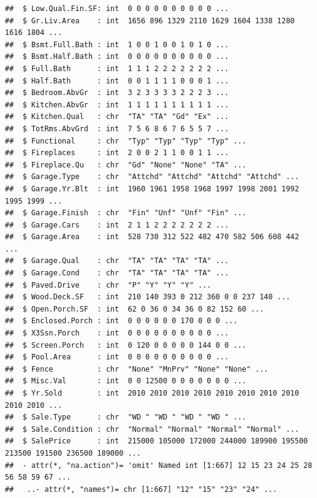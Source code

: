 \documentclass[
]{article}
\begin{document}
\begin{verbatim}
##  $ Low.Qual.Fin.SF: int  0 0 0 0 0 0 0 0 0 0 ...
##  $ Gr.Liv.Area    : int  1656 896 1329 2110 1629 1604 1338 1280 1616 1804 ...
##  $ Bsmt.Full.Bath : int  1 0 0 1 0 0 1 0 1 0 ...
##  $ Bsmt.Half.Bath : int  0 0 0 0 0 0 0 0 0 0 ...
##  $ Full.Bath      : int  1 1 1 2 2 2 2 2 2 2 ...
##  $ Half.Bath      : int  0 0 1 1 1 1 0 0 0 1 ...
##  $ Bedroom.AbvGr  : int  3 2 3 3 3 3 2 2 2 3 ...
##  $ Kitchen.AbvGr  : int  1 1 1 1 1 1 1 1 1 1 ...
##  $ Kitchen.Qual   : chr  "TA" "TA" "Gd" "Ex" ...
##  $ TotRms.AbvGrd  : int  7 5 6 8 6 7 6 5 5 7 ...
##  $ Functional     : chr  "Typ" "Typ" "Typ" "Typ" ...
##  $ Fireplaces     : int  2 0 0 2 1 1 0 0 1 1 ...
##  $ Fireplace.Qu   : chr  "Gd" "None" "None" "TA" ...
##  $ Garage.Type    : chr  "Attchd" "Attchd" "Attchd" "Attchd" ...
##  $ Garage.Yr.Blt  : int  1960 1961 1958 1968 1997 1998 2001 1992 1995 1999 ...
##  $ Garage.Finish  : chr  "Fin" "Unf" "Unf" "Fin" ...
##  $ Garage.Cars    : int  2 1 1 2 2 2 2 2 2 2 ...
##  $ Garage.Area    : int  528 730 312 522 482 470 582 506 608 442 ...
##  $ Garage.Qual    : chr  "TA" "TA" "TA" "TA" ...
##  $ Garage.Cond    : chr  "TA" "TA" "TA" "TA" ...
##  $ Paved.Drive    : chr  "P" "Y" "Y" "Y" ...
##  $ Wood.Deck.SF   : int  210 140 393 0 212 360 0 0 237 140 ...
##  $ Open.Porch.SF  : int  62 0 36 0 34 36 0 82 152 60 ...
##  $ Enclosed.Porch : int  0 0 0 0 0 0 170 0 0 0 ...
##  $ X3Ssn.Porch    : int  0 0 0 0 0 0 0 0 0 0 ...
##  $ Screen.Porch   : int  0 120 0 0 0 0 0 144 0 0 ...
##  $ Pool.Area      : int  0 0 0 0 0 0 0 0 0 0 ...
##  $ Fence          : chr  "None" "MnPrv" "None" "None" ...
##  $ Misc.Val       : int  0 0 12500 0 0 0 0 0 0 0 ...
##  $ Yr.Sold        : int  2010 2010 2010 2010 2010 2010 2010 2010 2010 2010 ...
##  $ Sale.Type      : chr  "WD " "WD " "WD " "WD " ...
##  $ Sale.Condition : chr  "Normal" "Normal" "Normal" "Normal" ...
##  $ SalePrice      : int  215000 105000 172000 244000 189900 195500 213500 191500 236500 189000 ...
##  - attr(*, "na.action")= 'omit' Named int [1:667] 12 15 23 24 25 28 56 58 59 67 ...
##   ..- attr(*, "names")= chr [1:667] "12" "15" "23" "24" ...
\end{verbatim}
\end{document}
